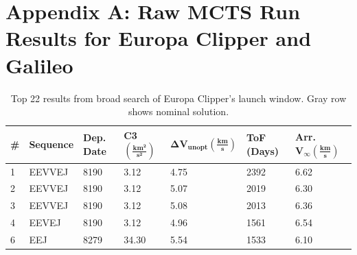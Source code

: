 \documentclass[letterpaper, preprint, paper,11pt]{AAS}	%
\begin{document}
\appendix
\clearpage
\section*{Appendix A: Raw MCTS Run Results for Europa Clipper and Galileo}

\begin{table}[h!]
    \centering
    \caption{Top 22 results from broad search of Europa Clipper's launch window. Gray row shows nominal solution.}
    \begin{tabular}{lllllll}
        \toprule
        \textbf{\textbf{\#}}\hspace{2em} & \textbf{\textbf{Sequence}} & \textbf{Dep. Date}\footnotemark[1] & \textbf{\textbf{C3} $\boldsymbol{(\frac{km^2}{s^2})}$} & \textbf{$\boldsymbol{\Delta V_{unopt} (\frac{km}{s})}$} & \textbf{\textbf{ToF (Days) }} & \textbf{\textbf{Arr.} $\boldsymbol{V_\infty (\frac{km}{s})}$} \\
        \midrule
        1                           & EEVVEJ                     & 8190                            & 3.12                                                   & 4.75                                                    & 2392                       & 6.62                                                             \\
        2                           & EEVVEJ                     & 8190                            & 3.12                                                   & 5.07                                                    & 2019                       & 6.30                                                             \\
        3                           & EEVVEJ                     & 8190                            & 3.12                                                   & 5.08                                                    & 2013                       & 6.36                                                             \\
        4                           & EEVEJ                      & 8190                            & 3.12                                                   & 4.96                                                    & 1561                       & 6.54                                                             \\
        6                           & EEJ                        & 8279                            & 34.30                                                  & 5.54                                                    & 1533                       & 6.10                                                             \\

\end{tabular}
\end{table}
\end{document}

